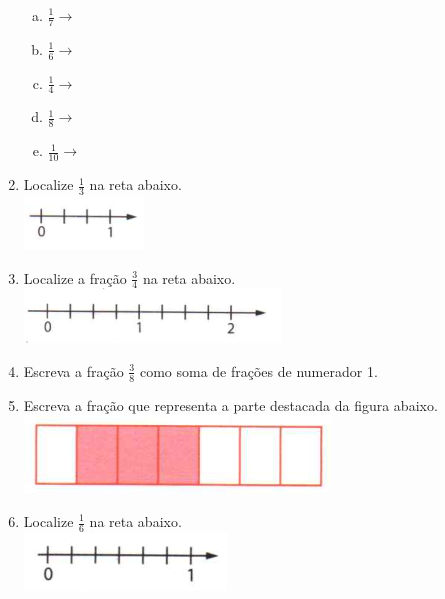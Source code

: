 \documentclass[a4paper,14pt]{article}
\begin{document}
\begin{multicols}{2}
\begin{enumerate}
\begin{enumerate}[a)]
				\item $\frac{1}{7} \longrightarrow$
				\item $\frac{1}{6} \longrightarrow$
				\item $\frac{1}{4} \longrightarrow$
				\item $\frac{1}{8} \longrightarrow$
				\item $\frac{1}{10} \longrightarrow$
			\end{enumerate}
			\item Localize $\frac{1}{3}$ na reta abaixo. \\
			\includegraphics[width=0.5\linewidth]{6FMA07_imagens/imagem04} \\
			\item Localize a fração $\frac{3}{4}$ na reta abaixo. \\
			\includegraphics[width=1.1\linewidth]{6FMA07_imagens/imagem05} \\
			\item Escreva a fração $\frac{3}{8}$ como soma de frações de numerador 1.
			\item Escreva a fração que representa a parte destacada da figura abaixo. \\
			\includegraphics[width=1.1\linewidth]{6FMA07_imagens/imagem06} \\
			\item Localize $\frac{1}{6}$ na reta abaixo. \\
			\includegraphics[width=1\linewidth]{6FMA07_imagens/imagem07} \\\\

\end{enumerate}
\end{multicols}
\end{document}
